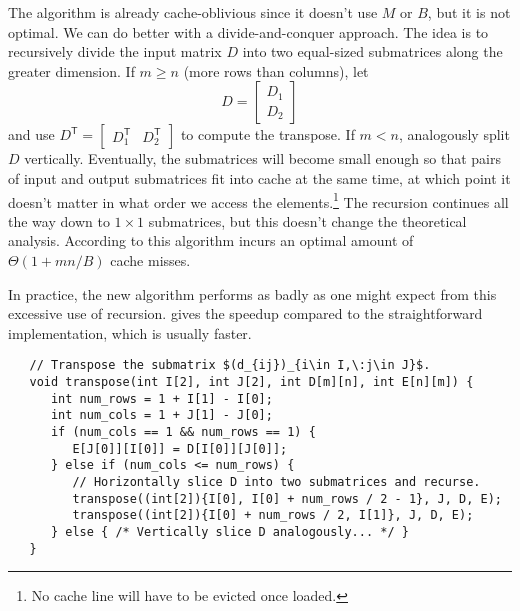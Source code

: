 The algorithm is  already cache-oblivious since it
doesn't use \(M\) or \(B\), but it is not optimal.  We can do better
with a divide-and-conquer approach.  The idea is to recursively divide the input matrix
\(D\) into two equal-sized submatrices along the greater dimension.  If \(m \geq n\) (more
rows than columns), let
\begin{equation*}
   D = \begin{bmatrix}
      D_1\\
      D_2
   \end{bmatrix}
\end{equation*}
and use \(D^\mathsf{T} = \begin{bmatrix} D_1^\mathsf{T} & D_2^\mathsf{T} \end{bmatrix}\)
to compute the transpose.  If \(m < n\), analogously split \(D\) vertically.  Eventually,
the submatrices will become small enough so that pairs of input and output submatrices fit
into cache at the same time, at which point it doesn't matter in what order we access the
elements.\footnote{%
   No cache line will have to be evicted once loaded.
}
The recursion continues all the way down to \(1 \times 1\) submatrices, but this doesn't
change the theoretical analysis.  According to
\textcite[theorem 2 and 3, \ppno~19--21]{coa-thesis}
this algorithm incurs an optimal amount of \(\Theta(1 + mn / B)\) cache misses.

In practice, the new algorithm performs as badly as one might expect from this excessive
use of recursion.   gives the speedup compared to the
straightforward implementation, which is usually faster.

\begin{verbatim}
   // Transpose the submatrix $(d_{ij})_{i\in I,\:j\in J}$.
   void transpose(int I[2], int J[2], int D[m][n], int E[n][m]) {
      int num_rows = 1 + I[1] - I[0];
      int num_cols = 1 + J[1] - J[0];
      if (num_cols == 1 && num_rows == 1) {
         E[J[0]][I[0]] = D[I[0]][J[0]];
      } else if (num_cols <= num_rows) {
         // Horizontally slice D into two submatrices and recurse.
         transpose((int[2]){I[0], I[0] + num_rows / 2 - 1}, J, D, E);
         transpose((int[2]){I[0] + num_rows / 2, I[1]}, J, D, E);
      } else { /* Vertically slice D analogously... */ }
   }
\end{verbatim}

